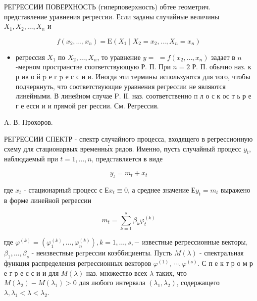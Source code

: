 \documentclass[10pt]{article}
\begin{document}
РЕГРЕССИИ ПОВЕРХНОСТЬ (гиперповерхность) обтее геометрич. представление уравнения регрессии. Если заданы случайные величины $X_{1}, X_{2}, \ldots, X_{n}$ и



\[

f\left(x_{2}, \ldots, x_{n}\right)=\mathrm{E}\left(X_{1} \mid X_{2}=x_{2}, \ldots, X_{n}=x_{n}\right)

\]



\begin{itemize}

  \item регрессия $X_{1}$ по $X_{2}, \ldots, X_{n}$, то уравнение $y=$ $=f\left(x_{2}, \ldots, x_{n}\right)$ задает в $n$-мерном пространстве соответствующую Р. П. При $n=2$ Р. П. обычно наз. к р ив о й $\mathrm{p}$ е г p е с с и и. Иногда эти термины используются для того, чтобы подчеркнуть, что соответствующие уравнения регрессии не являются линейными. В линейном случае $\mathrm{P}$. ІІ. наз. соответственно п л о с к ос т ь р е г е есси и и прямой рег рессии. См. Регрессия.

\end{itemize}



A. В. Прохоров.



РЕГРЕССИИ СПЕКТР - спектр случайного процесса, входящего в регрессионную схему для стационарвых временны́х рядов. Именно, пусть случайный процесс $y_{t}$, наблюдаемый при $t=1, \ldots, n$, представляется в виде



\[

y_{t}=m_{t}+x_{t}

\]



где $x_{t}$ - стационарный процесс с $Е x_{t} \equiv 0$, а среднее значение $Е y_{t}=m_{t}$ выражено в форме линейной регрессии



\[

m_{t}=\sum_{k=1}^{s} \beta_{k} \varphi_{t}^{(k)}

\]



где $\varphi^{(k)}=\left(\varphi_{1}^{(k)}, \ldots, \varphi_{n}^{(k)}\right), k=1, \ldots, s,-$ известные регрессионные векторы, $\beta_{1}, \ldots, \beta_{s}$ - неизвестные рeгрессии коэббициенты. Пусть $M(\lambda)$ - спектральная функция распределения регрессионных векторов $\varphi^{(1)}$, $\cdots, \varphi^{(s)}$. С п е к т р о м р е г р е с с и и для $M(\lambda)$ наз. множество всех $\lambda$ таких, что $M\left(\lambda_{2}\right)-M\left(\lambda_{1}\right)>0$ для любого интервала $\left(\lambda_{1}, \lambda_{2}\right)$, содержащего $\lambda, \lambda_{1}<\lambda<\lambda_{2}$.
\end{document}
